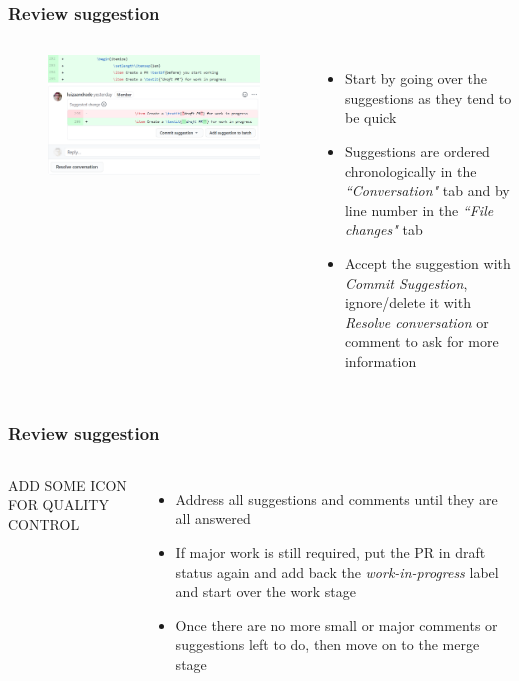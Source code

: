 \documentclass[aspectratio=169]{beamer} %
\begin{document}
\begin{frame}
	\frametitle{Review suggestion}
	\begin{columns}[c]
		
		\vspace{-.75cm}
		\begin{figure}
			\centering
			\includegraphics[width=\textwidth]{./img/review-suggestion-1.png}
		\end{figure}	
		
		\begin{itemize}
			\setlength\itemsep{1em}
			\item Start by going over the suggestions as they tend to be quick  
			\item Suggestions are ordered chronologically in the \textit{``Conversation"} tab and by line number in the \textit{``File changes"} tab
			\item Accept the suggestion with \textit{Commit Suggestion}, ignore/delete it with \textit{Resolve conversation} or comment to ask for more information
		\end{itemize}
		
	\end{columns}
\end{frame}

\begin{frame}
	\frametitle{Review suggestion}
	\begin{columns}[c]
		
		\Large ADD SOME ICON FOR QUALITY CONTROL
		
		\begin{itemize}
			\setlength\itemsep{1em}
			\item Address all suggestions and comments until they are all answered
			\item If major work is still required, put the PR in draft status again and add back the \textit{work-in-progress} label and start over the work stage
			\item Once there are no more small or major comments or suggestions left to do, then move on to the merge stage
		\end{itemize}
		
	\end{columns}
\end{frame}
\end{document}
